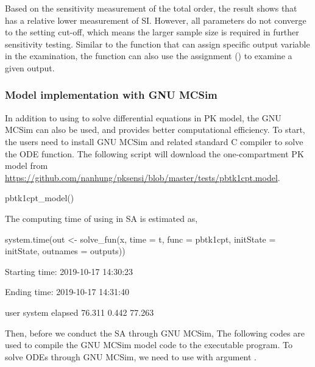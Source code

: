 Based on the sensitivity measurement of the total order, the result
shows that  has a relative lower measurement of SI. However,
all parameters do not converge to the setting cut-off, which means the
larger sample size is required in further sensitivity testing. Similar
to the  function that can assign specific output variable in
the examination, the  function can also use the assignment
() to examine a given output.

\hypertarget{model-implementation-with-gnu-mcsim}{%
\subsubsection{Model implementation with GNU
MCSim}\label{model-implementation-with-gnu-mcsim}}

In addition to using  to solve differential equations
in PK model, the GNU MCSim can also be used, and provides better
computational efficiency. To start, the users need to install GNU MCSim
and related standard C compiler to solve the ODE function. The following
script will download the one-compartment PK model from
\url{https://github.com/nanhung/pksensi/blob/master/tests/pbtk1cpt.model}.

\begin{Schunk}
\begin{Sinput}
pbtk1cpt_model()
\end{Sinput}
\end{Schunk}

The computing time of using  in SA is estimated as,

\begin{Schunk}
\begin{Sinput}
system.time(out <- solve_fun(x, time = t, 
                             func = pbtk1cpt, initState = initState, 
                             outnames = outputs))
\end{Sinput}
\begin{Soutput}
  Starting time: 2019-10-17 14:30:23
\end{Soutput}
\begin{Soutput}
  Ending time: 2019-10-17 14:31:40
\end{Soutput}
\begin{Soutput}
     user  system elapsed 
   76.311   0.442  77.263
\end{Soutput}
\end{Schunk}

Then, before we conduct the SA through GNU MCSim, The following codes
are used to compile the GNU MCSim model code to the executable program.
To solve ODEs through GNU MCSim, we need to use 
with argument .

